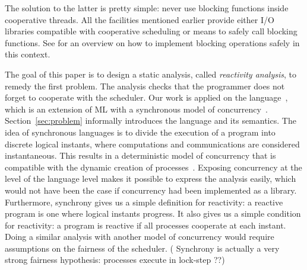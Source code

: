 \documentclass[9pt,preprint]{sigplanconf}
\newcommand{\todo}[1]{ {\color{red} #1}}
\begin{document}

The solution to the latter is pretty simple: never use blocking functions inside cooperative threads. All the facilities mentioned earlier provide either I/O libraries compatible with cooperative scheduling or means to safely call blocking functions. See \cite{Marlow:2004} for an overview on how to implement blocking operations safely in this context.


The goal of this paper is to design a static analysis, called \emph{reactivity analysis}, to remedy the first problem. The analysis checks that the programmer does not forget to cooperate with the scheduler.
%
Our work is applied on the \rml language~\cite{Mandel:2005}, which is an extension of ML with a synchronous model of concurrency~\cite{Benveniste:2003}. Section~\ref{sec:problem} informally introduces the language and its semantics. The idea of synchronous languages is to divide the execution of a program into discrete logical instants, where computations and communications are considered instantaneous. This results in a deterministic model of concurrency that is compatible with the dynamic creation of processes~\cite{Boussinot:1991}. Exposing concurrency at the level of the language level makes it possible to express the analysis easily, which would not have been the case if concurrency had been implemented as a library. Furthermore, synchrony gives us a simple definition for reactivity: a reactive \rml program is one where logical instants progress. It also gives us a simple condition for reactivity: a program is reactive if all processes cooperate at each instant. Doing a similar analysis with another model of concurrency would require assumptions on the fairness of the scheduler. (\todo{Synchrony is actually a very strong fairness hypothesis: processes execute in lock-step ??})
\end{document}
